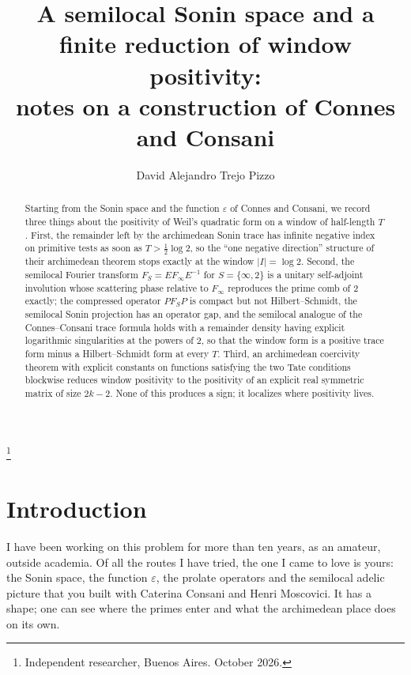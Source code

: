 \documentclass[11pt]{amsart}
\theoremstyle{definition}
\theoremstyle{remark}
\begin{document}
\title[A semilocal Sonin space and a finite reduction]{A semilocal Sonin space and a finite reduction of window positivity:\\ notes on a construction of Connes and Consani}
\author{David Alejandro Trejo Pizzo}
\thanks{Independent researcher, Buenos Aires. October 2026.}
\date{}

\begin{abstract}
Starting from the Sonin space and the function $\varepsilon$ of Connes and Consani, we record three
things about the positivity of Weil's quadratic form on a window of half-length $T$. First, the
remainder left by the archimedean Sonin trace has infinite negative index on primitive tests as soon as
$T>\frac12\log2$, so the ``one negative direction'' structure of their archimedean theorem stops exactly
at the window $|I|=\log2$. Second, the semilocal Fourier transform $F_S=EF_\infty E^{-1}$ for $S=\{\infty,2\}$ is a
unitary self-adjoint involution whose scattering phase relative to $F_\infty$ reproduces the prime comb
of $2$ exactly; the compressed operator $PF_SP$ is compact but not Hilbert--Schmidt, the semilocal Sonin
projection has an operator gap, and the semilocal analogue of the Connes--Consani trace formula holds with
a remainder density having explicit logarithmic singularities at the powers of $2$, so that the window
form is a positive trace form minus a Hilbert--Schmidt form at every $T$. Third, an archimedean coercivity
theorem with explicit constants on functions satisfying the two Tate conditions blockwise reduces window
positivity to the positivity of an explicit real symmetric matrix of size $2k-2$. None of this produces a
sign; it localizes where positivity lives.
\end{abstract}

\maketitle

\section{Introduction}

I have been working on this problem for more than ten years, as an amateur, outside academia. Of all the
routes I have tried, the one I came to love is yours: the Sonin space, the function $\varepsilon$, the
prolate operators and the semilocal adelic picture that you built with Caterina Consani and Henri
Moscovici. It has a shape; one can see where the primes enter and what the archimedean place does on its
own.
\end{document}
